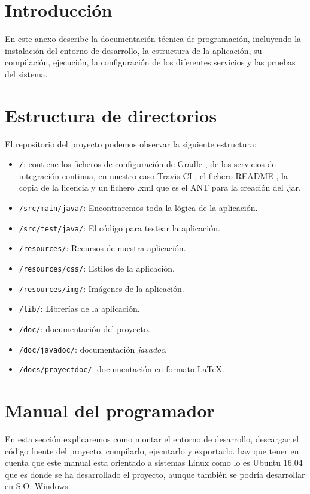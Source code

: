 
\section{Introducción}

En este anexo describe la documentación técnica de programación,
incluyendo la instalación del entorno de desarrollo, la estructura de la
aplicación, su compilación, ejecución, la configuración de los diferentes servicios y las pruebas del sistema.

\section{Estructura de directorios}

El repositorio del proyecto podemos observar la siguiente estructura:

\begin{itemize}
	\tightlist
	\item
	\texttt{/}: contiene los ficheros de configuración de Gradle \cite{gradle}, de los servicios de integración continua, en nuestro caso Travis-CI \cite{web:travis}, el fichero README , la copia de la
	licencia y un fichero .xml que es el ANT para la creación del .jar.
	\item
	\texttt{/src/main/java/}: Encontraremos toda la lógica de la aplicación.
	\item
	\texttt{/src/test/java/}: El código para testear la aplicación.
	\item
	\texttt{/resources/}: Recursos de nuestra aplicación.
	\item
	\texttt{/resources/css/}: Estilos de la aplicación.
	\item
	\texttt{/resources/img/}: Imágenes de la aplicación.
	\item
	\texttt{/lib/}: Librerías de la aplicación.
	\item
	\texttt{/doc/}: documentación del proyecto.
	\item
	\texttt{/doc/javadoc/}: documentación \emph{javadoc}.
	\item
	\texttt{/docs/proyectdoc/}: documentación en formato \LaTeX.
\end{itemize}

\section{Manual del programador}

En esta sección explicaremos como montar el entorno de desarrollo, descargar el código fuente del proyecto, compilarlo, ejecutarlo y exportarlo. hay que tener en cuenta que este manual esta orientado a sistemas Linux como lo es Ubuntu 16.04 que es donde se ha desarrollado el proyecto, aunque también se podría desarrollar en S.O. Windows.

